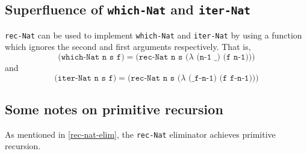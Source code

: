 \documentclass{article}
\newcommand{\ttt}[1]{\texttt{#1}}
\begin{document}
\subsection{Superfluence of \ttt{which-Nat} and \ttt{iter-Nat}}
\ttt{rec-Nat} can be used to implement \ttt{which-Nat} and \ttt{iter-Nat} by using a function which ignores the second and first arguments respectively. That is, \[
    \ttt{(which-Nat n s f)} = \ttt{(rec-Nat n s (\(\lambda\) (n-1 \_) (f n-1)))}
\]
and \[
    \ttt{(iter-Nat n s f)} = \ttt{(rec-Nat n s (\(\lambda\) (\_ f-n-1) (f f-n-1)))}
\]
\subsection{Some notes on primitive recursion}
As mentioned in \autoref{rec-nat-elim}, the \ttt{rec-Nat} eliminator achieves primitive recursion.
\end{document}

